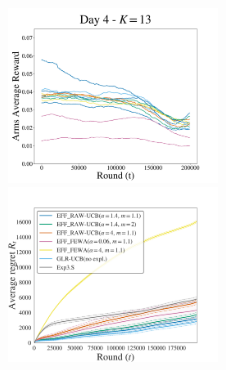 \begin{figure}[p!]
\includegraphics[clip, width= 0.495\textwidth]{2.2Restless/fig/reward_plot_day4.pdf}
\includegraphics[clip, width= 0.495\textwidth]{2.2Restless/fig/DAY4.pdf}
\end{figure}

